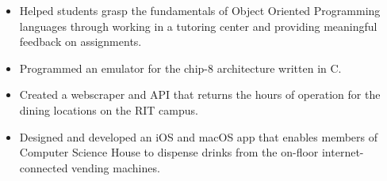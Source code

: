 \documentclass[10pt,letter,ragged2e]{altacv}
\begin{document}
\divider

\begin{itemize}
    \item Helped students grasp the fundamentals of Object Oriented Programming languages through working in a tutoring center and providing meaningful feedback on assignments.
\end{itemize}


\begin{itemize}
  \item Programmed an emulator for the chip-8 architecture written in C. 
\end{itemize}

\divider

\begin{itemize}
  \item Created a webscraper and API that returns the hours of operation for the dining locations on the RIT campus.
\end{itemize}

\divider

\begin{itemize}
  \item Designed and developed an iOS and macOS app that enables members of Computer Science House to dispense drinks from the on-floor internet-connected vending machines. 
\end{itemize}
%

\clearpage
\end{document}

